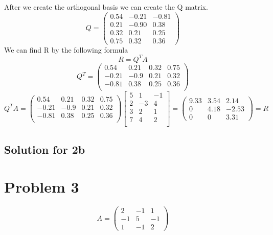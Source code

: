 \documentclass[a4paper,fleqn,12pt]{article}
\begin{document}
After we create the orthogonal basis we can create the Q matrix.
$$
Q = 
\begin{pmatrix} 
0.54 & -0.21 & -0.81 \\
0.21 & -0.90 & 0.38 \\
0.32 & 0.21 & 0.25 \\
0.75 & 0.32 & 0.36
\end{pmatrix}
$$
We can find R by the following formula 
$$
R = Q^T A
$$
$$
Q^T = 
\begin{pmatrix} 
0.54 & 0.21 & 0.32 & 0.75 \\
-0.21 & -0.9 & 0.21 & 0.32 \\
-0.81 & 0.38 & 0.25 & 0.36 \\
\end{pmatrix}
$$
$$
Q^TA =
 \begin{pmatrix} 
0.54 & 0.21 & 0.32 & 0.75 \\
-0.21 & -0.9 & 0.21 & 0.32 \\
-0.81 & 0.38 & 0.25 & 0.36 \\
\end{pmatrix} 
\begin{bmatrix}
	5 & 1 & -1 \\
	2 & -3 & 4 \\
	3 & 2 & 1 \\
	7 & 4 & 2 \\
\end{bmatrix} = 
\begin{pmatrix}
9.33 & 3.54 & 2.14 \\
0 & 4.18 & -2.53 \\
0 & 0 & 3.31
\end{pmatrix} = R
$$


\subsection{Solution for 2b}
\newpage

\section{Problem 3}
$$
A = 
\begin{pmatrix}
2 & -1 & 1 \\
-1 & 5 & -1 \\
1 & -1 & 2 
\end{pmatrix}
$$
\end{document}
